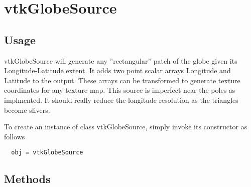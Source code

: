 \section{vtkGlobeSource}

\subsection{Usage}

 vtkGlobeSource will generate any ''rectangular'' patch of the globe
 given its Longitude-Latitude extent.  It adds two point scalar arrays
 Longitude and Latitude to the output.  These arrays can be transformed
 to generate texture coordinates for any texture map.  This source is 
 imperfect near the poles as implmented.  It should really reduce the
 longitude resolution as the triangles become slivers.

 
 

To create an instance of class vtkGlobeSource, simply
invoke its constructor as follows
\begin{verbatim}
  obj = vtkGlobeSource
\end{verbatim}
\subsection{Methods}


